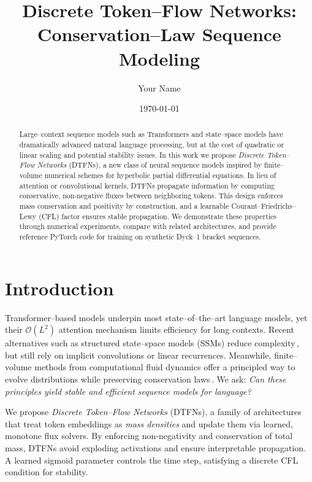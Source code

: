 \documentclass[10pt]{article}
\title{Discrete Token--Flow Networks: Conservation--Law Sequence Modeling}
\author{Your Name}
\date{\today}
\begin{document}
\maketitle

\begin{abstract}
Large–context sequence models such as Transformers and state–space models have
dramatically advanced natural language processing, but at the cost of quadratic
or linear scaling and potential stability issues. In this work we propose
\emph{Discrete Token–Flow Networks} (DTFNs), a new class of neural sequence
models inspired by finite–volume numerical schemes for hyperbolic partial
differential equations. In lieu of attention or convolutional kernels, DTFNs
propagate information by computing conservative, non‑negative fluxes between
neighboring tokens. This design enforces mass conservation and positivity by
construction, and a learnable Courant–Friedrichs–Lewy (CFL) factor ensures
stable propagation. We demonstrate these properties through numerical
experiments, compare with related architectures, and provide reference
PyTorch code for training on synthetic Dyck--1 bracket sequences.
\end{abstract}

\section{Introduction}
Transformer–based models underpin most state–of–the–art language models, yet
their $\mathcal{O}(L^2)$ attention mechanism limits efficiency for long contexts.
Recent alternatives such as structured state–space models (SSMs) reduce
complexity\,\cite{gu2021combining,gu2022efficiently}, but still rely on implicit
convolutions or linear recurrences. Meanwhile, finite–volume methods from
computational fluid dynamics offer a principled way to evolve distributions
while preserving conservation laws\,\cite{leveque2002finite}. We ask: \emph{Can
these principles yield stable and efficient sequence models for language?}

We propose \emph{Discrete Token--Flow Networks} (DTFNs), a family of
architectures that treat token embeddings as \emph{mass densities} and update
them via learned, monotone flux solvers. By enforcing non‑negativity and
conservation of total mass, DTFNs avoid exploding activations and ensure
interpretable propagation. A learned sigmoid parameter controls the time step,
satisfying a discrete CFL condition for stability.
\end{document}
